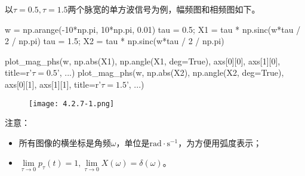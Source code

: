 以$\tau =0.5,\tau =1.5$两个脉宽的单方波信号为例，幅频图和相频图如下。

\begin{python}
w   = np.arange(-10*np.pi, 10*np.pi, 0.01)
tau = 0.5; X1 = tau * np.sinc(w*tau / 2 / np.pi)
tau = 1.5; X2 = tau * np.sinc(w*tau / 2 / np.pi)

plot_mag_phs(w, np.abs(X1), np.angle(X1, deg=True),
             axs[0][0], axs[1][0], title=r'$\tau =0.5$', ...)
plot_mag_phs(w, np.abs(X2), np.angle(X2, deg=True),
             axs[0][1], axs[1][1], title=r'$\tau =1.5$', ...)
\end{python}

\begin{figure}[h]
\centering
\texttt{[image: 4.2.7-1.png]}
\end{figure}

注意：
\begin{itemize}
    \item 所有图像的横坐标是角频$\omega $，单位是$\mathrm{rad}\cdot \mathrm{s}^{-1}$，为方便用弧度表示；
    \item $\underset{\tau \rightarrow 0}\lim p_{\tau}\left( t \right) =1,\underset{\tau \rightarrow 0}\lim X\left( \omega \right) =\delta \left( \omega \right) $。
\end{itemize}

